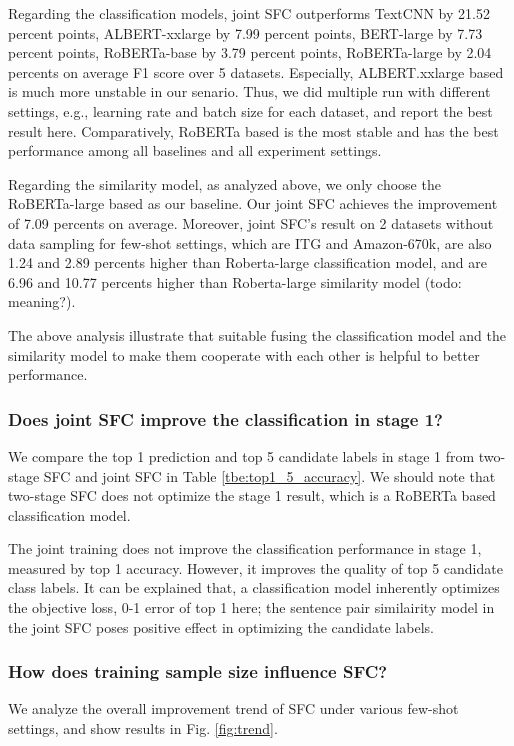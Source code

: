\documentclass[letterpaper]{article} %
\begin{document}
  Regarding the  classification  models,  joint SFC
  outperforms    TextCNN    by   21.52   percent points,   ALBERT-xxlarge   by   7.99
  percent points, BERT-large  by  7.73 percent points, RoBERTa-base by 3.79 
  percent points, RoBERTa-large by 2.04 percents on average F1 score over 5 datasets.  
  Especially, ALBERT.xxlarge based is much more  unstable  in our senario. Thus, 
  we did multiple run with different settings, e.g.,  learning rate and batch size 
  for each dataset, and  report the  best  result  here. Comparatively,  
  RoBERTa  based is  the  most stable and has the best performance among
  all baselines and all experiment settings.

  Regarding  the  similarity  model,  as  analyzed  above,  we  only  choose the
  RoBERTa-large based as our baseline. Our joint SFC achieves the improvement of
  7.09  percents  on average. Moreover, joint SFC's result on 2 datasets without
  data  sampling  for few-shot settings, which are ITG and Amazon-670k, are also
  1.24 and 2.89 percents higher than Roberta-large classification model, and are
  6.96 and 10.77 percents higher than Roberta-large similarity model (todo:
  meaning?).

  The above analysis illustrate that suitable fusing the classification model and the 
  similarity model to make them cooperate with each other is helpful to better
  performance.  

  \subsubsection*{Does joint SFC improve the classification in stage 1?}
  We  compare  the  top  1  prediction and top 5 candidate labels in stage 1 from
  two-stage SFC and joint SFC in Table \ref{tbe:top1_5_accuracy}. We should note
  that  two-stage  SFC  does not optimize the stage 1 result, which is a RoBERTa
  based classification model.

  The joint training does not improve the classification performance in stage 1,
  measured  by  top  1  accuracy.  However,  it  improves  the  quality of top 5
  candidate  class  labels.  It  can  be  explained that, a classification model
  inherently optimizes the objective loss, 0-1 error of top 1 here; the sentence
  pair similairity model in the joint SFC poses positive effect in optimizing the 
  candidate labels.


  \subsubsection*{How does training sample size influence SFC?} 
  We analyze the overall  improvement  trend  of  SFC under various few-shot
  settings, and show results in Fig. \ref{fig:trend}.
\end{document}
